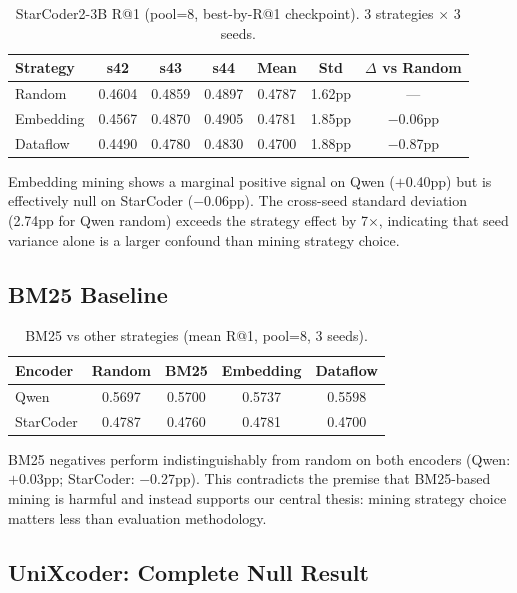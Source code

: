 \documentclass[11pt]{article}
\begin{document}
\begin{table}[h]
\centering
\caption{StarCoder2-3B R@1 (pool=8, best-by-R@1 checkpoint). 3 strategies $\times$ 3 seeds.}
\label{tab:starcoder_main}
\begin{tabular}{lcccccc}
\toprule
Strategy & s42 & s43 & s44 & Mean & Std & $\Delta$ vs Random \\
\midrule
Random & 0.4604 & 0.4859 & 0.4897 & 0.4787 & 1.62pp & --- \\
Embedding & 0.4567 & 0.4870 & 0.4905 & 0.4781 & 1.85pp & $-$0.06pp \\
Dataflow & 0.4490 & 0.4780 & 0.4830 & 0.4700 & 1.88pp & $-$0.87pp \\
\bottomrule
\end{tabular}
\end{table}

Embedding mining shows a marginal positive signal on Qwen ($+$0.40pp) but is effectively null on StarCoder ($-$0.06pp). The cross-seed standard deviation (2.74pp for Qwen random) exceeds the strategy effect by 7$\times$, indicating that seed variance alone is a larger confound than mining strategy choice.

\subsection{BM25 Baseline}

\begin{table}[h]
\centering
\caption{BM25 vs other strategies (mean R@1, pool=8, 3 seeds).}
\label{tab:bm25}
\begin{tabular}{lcccc}
\toprule
Encoder & Random & BM25 & Embedding & Dataflow \\
\midrule
Qwen & 0.5697 & 0.5700 & 0.5737 & 0.5598 \\
StarCoder & 0.4787 & 0.4760 & 0.4781 & 0.4700 \\
\bottomrule
\end{tabular}
\end{table}

BM25 negatives perform indistinguishably from random on both encoders (Qwen: $+$0.03pp; StarCoder: $-$0.27pp). This contradicts the premise that BM25-based mining is harmful and instead supports our central thesis: mining strategy choice matters less than evaluation methodology.

\subsection{UniXcoder: Complete Null Result}
\end{document}
